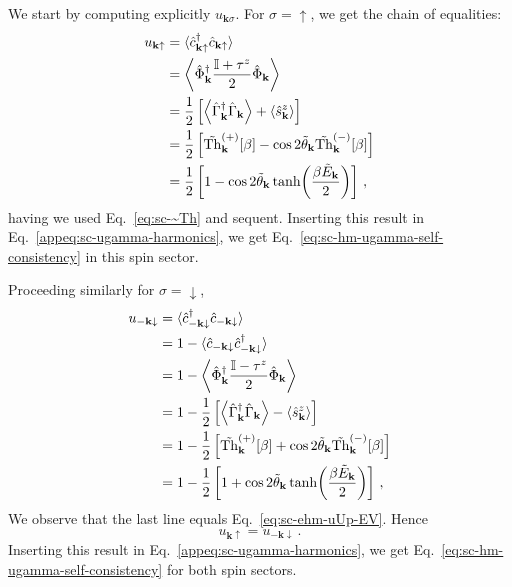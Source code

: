 \begin{tabproof}
	
	We start by computing explicitly $u_{\mathbf{k}\sigma}$. For $\sigma=\uparrow$, we get the chain of equalities:
	\begin{align}
		u_{\mathbf{k}\uparrow} &= \langle \hat c_{\mathbf{k}\uparrow}^\dagger \hat c_{\mathbf{k}\uparrow} \rangle \nonumber \\	
		&= \ev{
			\hat \Phi_\mathbf{k}^\dagger \frac{\Id + \tau^z}{2} \hat \Phi_\mathbf{k}
		} \nonumber \\
		&= \frac{1}{2} \left[
		\ev{
			\hat \Gamma_\mathbf{k}^\dagger \hat \Gamma_\mathbf{k}
		} + \ev{\hat s_\mathbf{k}^z}
		\right] \nonumber \\
		&= \frac{1}{2} \left[
		\tilde{\mathrm{Th}}_\mathbf{k}^{(+)} [\beta] - 
		\cos 2 \tilde{\theta}_\mathbf{k} \tilde{\mathrm{Th}}_\mathbf{k}^{(-)} [\beta]
		\right] \nonumber \\
		&= \frac{1}{2} \left[
		1 - \cos 2 \tilde{\theta}_\mathbf{k} \tanh(\frac{\beta \tilde{E}_\mathbf{k}}{2})
		\right] \, , \label{eq:sc-ehm-uUp-EV}
	\end{align}
	having we used Eq.~\eqref{eq:sc-~Th} and sequent. Inserting this result in Eq.~\eqref{appeq:sc-ugamma-harmonics}, we get Eq.~\eqref{eq:sc-hm-ugamma-self-consistency} in this spin sector. 
	
	Proceeding similarly for $\sigma=\downarrow$,
	\begin{align}
		u_{-\mathbf{k}\downarrow} &= \langle \hat c_{-\mathbf{k}\downarrow}^\dagger \hat c_{-\mathbf{k}\downarrow} \rangle \nonumber \\	
		&= 1 - \langle \hat c_{-\mathbf{k}\downarrow} \hat c_{-\mathbf{k}\downarrow}^\dagger \rangle \nonumber \\
		&= 1 - \ev{
			\hat \Phi_\mathbf{k}^\dagger \frac{\Id - \tau^z}{2} \hat \Phi_\mathbf{k}
		} \nonumber \\
		&= 1 - \frac{1}{2} \left[
		\ev{
			\hat \Gamma_\mathbf{k}^\dagger \hat \Gamma_\mathbf{k}
		} - \ev{\hat s_\mathbf{k}^z}
		\right] \nonumber \\
		&= 1 - \frac{1}{2} \left[
		\tilde{\mathrm{Th}}_\mathbf{k}^{(+)} [\beta] + 
		\cos 2 \tilde{\theta}_\mathbf{k} \tilde{\mathrm{Th}}_\mathbf{k}^{(-)} [\beta]
		\right] \nonumber \\
		&= 1 - \frac{1}{2} \left[
		1 + \cos 2 \tilde{\theta}_\mathbf{k} \tanh(\frac{\beta \tilde{E}_\mathbf{k}}{2})
		\right] \, , \label{eq:sc-ehm-uDown-EV}
	\end{align}
	We observe that the last line equals Eq.~\eqref{eq:sc-ehm-uUp-EV}. Hence
	\[
	u_{\mathbf{k}\uparrow} = 	u_{-\mathbf{k}\downarrow} \, .
	\]
	Inserting this result in Eq.~\eqref{appeq:sc-ugamma-harmonics}, we get Eq.~\eqref{eq:sc-hm-ugamma-self-consistency} for both spin sectors.
\end{tabproof}
